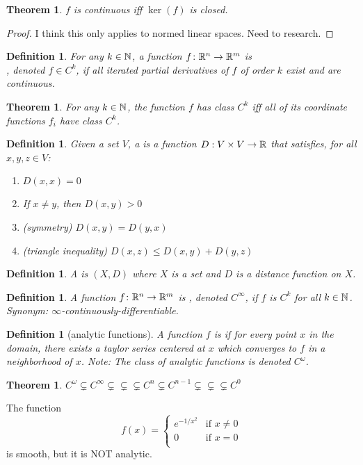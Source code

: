 \documentclass[11pt]{amsbook}
\theoremstyle{mystyle} %
\newtheorem{thrm}[thm]{Theorem}
\newtheorem{defi}[thm]{Definition}
\numberwithin{thm}{section}
\begin{document}
\begin{thrm}
	$f$ is continuous iff $\ker(f)$ is closed.
\end{thrm}
\begin{proof}
	I think this only applies to normed linear spaces.  Need to research.
\end{proof}
\begin{defi}
	For any $k \in {\mathbb N}$, a function $f\colon {\mathbb R}^n \to {\mathbb R}^m$ is \\, denoted $f \in C^k$, if all iterated partial derivatives of $f$ of order $k$ exist and are continuous.
\end{defi}
\begin{thrm}
	For any $k \in {\mathbb N}$, the function $f$ has class $C^k$ iff all of its coordinate functions $f_i$ have class $C^k$.
\end{thrm}
\begin{defi}
	Given a set $V$, a  is a function $D : V \times V \to {\mathbb R}$ that satisfies, for all $x, y, z \in V$:
	\begin{enumerate}
		\item $D(x,x) = 0$
		\item If $x \neq y$, then $D(x,y) > 0$
		\item (symmetry) $D(x,y) = D(y,x)$
		\item (triangle inequality) $D(x,z) \leq D(x,y) + D(y,z)$
	\end{enumerate}
\end{defi}
\begin{defi}
	A  is $(X, D)$ where $X$ is a set and $D$ is a distance function on $X$.
\end{defi}
\begin{defi}
	A function $f\colon {\mathbb R}^n \to {\mathbb R}^m$ is , denoted $C^\infty$, if $f$ is $C^k$ for all $k \in {\mathbb N}$.
	Synonym: $\infty$-continuously-differentiable.
\end{defi}
\begin{defi}[analytic functions]
	A function $f$ is  if for every point $x$ in the domain, there exists a taylor series centered at $x$ which converges to $f$ in a neighborhood of $x$.  Note: The class of analytic functions is denoted $C^\omega$.
\end{defi}
\begin{thrm}
	$C^\omega \subsetneq C^\infty \subsetneq \subsetneq \subsetneq C^n \subsetneq C^{n-1} \subsetneq \subsetneq \subsetneq C^0$
\end{thrm}
\begin{example}
	The function $$f(x) =
	\begin{cases}
		e^{-1/x^2}	&\text{if $x \neq 0$} \\
		0			&\text{if $x=0$} \\
	\end{cases}
	$$
	is smooth, but it is NOT analytic.
\end{example}
\end{document}
